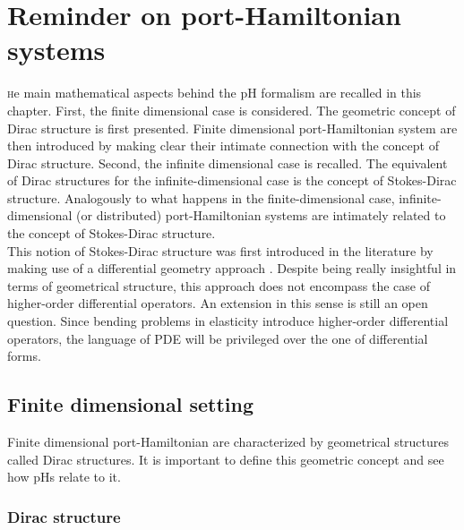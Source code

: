 \chapter{Reminder on port-Hamiltonian systems}

\minitoc

\lettrine{\color{theme}{T}}he main mathematical aspects behind the pH formalism are recalled in this chapter. First, the finite dimensional case is considered. The geometric concept of Dirac structure \cite{courant1990} is first presented. Finite dimensional port-Hamiltonian system are then introduced by making clear their intimate connection with the concept of Dirac structure. Second, the infinite dimensional case is recalled. The equivalent of Dirac structures for the infinite-dimensional case is the concept of Stokes-Dirac structure. Analogously to what happens in the finite-dimensional case, infinite-dimensional (or distributed) port-Hamiltonian systems are intimately related to the concept of Stokes-Dirac structure. \\

This notion of Stokes-Dirac structure was first introduced in the literature by making use of a differential geometry approach \cite{vanderschaft2002}. Despite being really insightful in terms of geometrical structure, this approach does not encompass the case of higher-order differential operators. An extension in this sense is still an open question. Since bending problems in elasticity introduce higher-order differential operators, the language of PDE will be privileged over the one of differential forms.

 
\section{Finite dimensional setting}

Finite dimensional port-Hamiltonian are characterized by geometrical structures called Dirac structures. It is important to define this geometric concept and see how pHs relate to it. \\

\subsection{Dirac structure}

